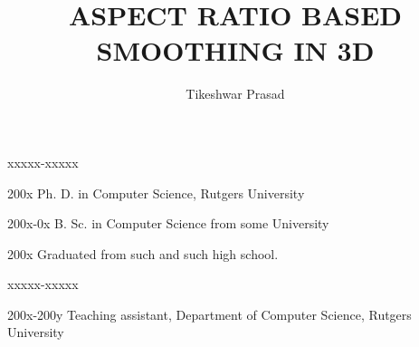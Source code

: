 \documentclass{ruthesis}
\begin{document}
\title{ASPECT RATIO BASED SMOOTHING IN 3D}
\author{Tikeshwar Prasad}



\beforepreface
{}
\dedication{The body of the dedication}
\afterpreface








\begin{vita}
 \vspace{15pt}
\begin{descriptionlist}{xxxxx-xxxxx} %
\item[200x] Ph. D. in Computer Science, Rutgers University
\item[200x-0x] B. Sc. in Computer Science from some University
\item[200x] Graduated from such and such high school.
\end{descriptionlist}
\medskip
\begin{descriptionlist}{xxxxx-xxxxx} %
\item[200x-200y] Teaching assistant, Department of Computer Science, Rutgers University
\end{descriptionlist}
\end{vita}
\end{document}
